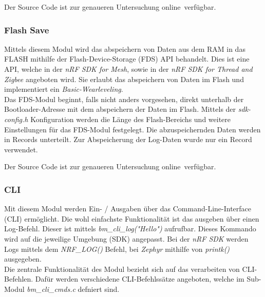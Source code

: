 Der Source Code ist zur genaueren Untersuchung online\footnotemark\ verfügbar. 


\subsubsection{Flash Save}\label{subsubsec:FlashSave}

Mittels diesem Modul wird das abspeichern von Daten aus dem RAM in das FLASH mithilfe der Flash-Device-Storage (FDS) API behandelt. Dies ist eine API, welche in der \textit{nRF SDK for Mesh}, sowie in der \textit{nRF SDK for Thread and Zigbee} angeboten wird. Sie erlaubt das abspeichern von Daten im Flash und implementiert ein \textit{Basic-Wearleveling}. \\

Das FDS-Modul beginnt, falls nicht anders vorgesehen, direkt unterhalb der Bootloader-Adresse mit dem abspeichern der Daten im Flash. Mittels der \textit{sdk-config.h} Konfiguration werden die Länge des Flash-Bereichs und weitere Einstellungen für das FDS-Modul festgelegt. Die abzuspeichernden Daten werden in Records unterteilt. Zur Abspeicherung der Log-Daten wurde nur ein Record verwendet. \cite{nordic_semi_nrf5_sdk_flash_data_storage_2020}

Der Source Code ist zur genaueren Untersuchung online\footnotemark\ verfügbar. 


\subsubsection{CLI}\label{subsubsec:CLI}

Mit diesem Modul werden Ein- / Ausgaben über das Command-Line-Interface (CLI) ermöglicht. Die wohl einfachste Funktionalität ist das ausgeben über einen Log-Befehl. Dieser ist mittels \textit{bm\_cli\_log("Hello")} aufrufbar. Dieses Kommando wird auf die jeweilige Umgebung (SDK) angepasst. Bei der \textit{nRF SDK} werden Logs mittels dem \textit{NRF\_LOG()} Befehl, bei \textit{Zephyr} mithilfe von \textit{printk()} ausgegeben. \\

Die zentrale Funktionalität des Modul bezieht sich auf das verarbeiten von CLI-Befehlen. Dafür werden verschiedene CLI-Befehlssätze angeboten, welche im Sub-Modul \textit{bm\_cli\_cmds.c} defniert sind. 

